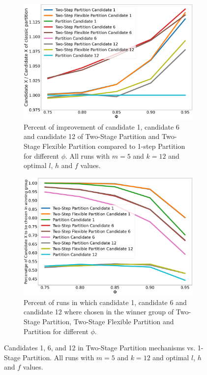 \documentclass[letterpaper]{article} %
\begin{document}
\begin{figure}[t]
\centering
 \begin{subfigure}{0.8\columnwidth}
 \includegraphics[width=\columnwidth]{"./images/improve_in_candidates_review_5_winner_12_new_new_new.png"}
 \caption{Percent of improvement of candidate 1, candidate 6 and candidate 12 of Two-Stage Partition and Two-Stage Flexible Partition compared to 1-step Partition for different $\phi$. All runs with $m = 5$ and $k = 12$ and optimal $l$, $h$ and $f$ values.}
 \label{fig:candidates-performances_per_candidates}
 \end{subfigure}%
\vspace{1cm}
 \begin{subfigure}{0.8\columnwidth}
 \includegraphics[width=\columnwidth]{"./images/improve_in_candidates_review_5_winner_12_percenatge_new_new_new.png"}
 \caption{Percent of runs in which candidate 1, candidate 6 and candidate 12 where chosen in the winner group of Two-Stage Partition, Two-Stage Flexible Partition and Partition for different $\phi$.}
 \label{fig:candidates-performances_per_candidates_in_winning_group}
 \end{subfigure}
 \label{fig:first}
 \caption{Candidates 1, 6, and 12 in Two-Stage Partition mechanisms vs. 1-Stage Partition. All runs with $m = 5$ and $k = 12$ and optimal $l$, $h$ and $f$ values.}
\end{figure}
\end{document}
